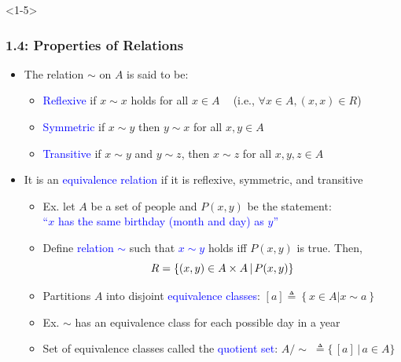 \documentclass[10pt,english,aspectratio=169]{beamer}
\begin{document}
\begin{frame}<1-5> \frametitle{1.4: Properties of Relations}

\begin{itemize}
\setlength\itemsep{5mm}
\item<1-> The relation $\sim$ on $A$ is said to be: \vspace{1mm}
\begin{itemize}
  \setlength\itemsep{1.5mm}
  \item \textcolor{blue}{Reflexive} if $x\sim x$ holds for all $x\in A$ $\;\;$ (i.e., $\forall x\in A, (x,x) \in R$)
  \item \textcolor{blue}{Symmetric} if $x\sim y$ then $y\sim x$ for all $x,y\in A$
  \item \textcolor{blue}{Transitive} if $x\sim y$ and $y\sim z$, then $x\sim z$ for all $x,y,z\in A$
\end{itemize}

\item<2-> It is an \textcolor{blue}{equivalence relation} if it is reflexive, symmetric, and transitive \vspace{1mm}

\begin{itemize}
  \setlength\itemsep{1.5mm}
  \item Ex. let $A$ be a set of people and $P(x,y)$ be the statement: \\ \textcolor{blue}{``$x$ has the same birthday (month and day) as $y$''}
  \item Define \textcolor{blue}{relation $\sim$} such that \textcolor{blue}{$x\sim y$} holds iff $P(x,y)$ is true.  Then, \vspace{-1mm}
  \[ R = \{ (x,y)\in A\times A \,|\, P(x,y) \} \vspace*{-1mm} \]
  \item<3-> Partitions $A$ into disjoint \textcolor{blue}{equivalence classes}: $[a] \triangleq \left\{x\in A | x \sim a\right\}$
  \item<4-> Ex. $\sim$ has an equivalence class for each possible day in a year
  \item<5-> Set of equivalence classes called the \textcolor{blue}{quotient set}: $A / \!\sim \;\triangleq \{ \, [a] \, | \, a\in A \}\!\!\!\!\!$

\end{itemize}
\end{itemize}


\end{frame}
\end{document}
